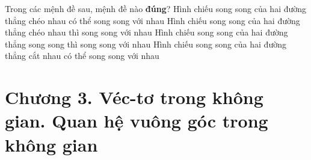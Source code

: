 \begin{ex}%
	Trong các mệnh đề sau, mệnh đề nào \textbf{đúng}?
	\choice
	{\True Hình chiếu song song của hai đường thẳng chéo nhau có thể song song với nhau}
	{Hình chiếu song song của hai đường thẳng chéo nhau thì song song với nhau}
	{Hình chiếu song song của hai đường thẳng song song thì song song với nhau}
	{Hình chiếu song song của hai đường thẳng cắt nhau có thể song song với nhau}
\end{ex}
\chapter{Chương 3. Véc-tơ trong không gian. Quan hệ vuông góc trong không gian}
